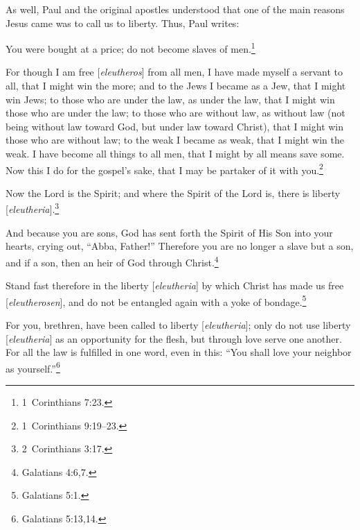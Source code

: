 \documentclass[letterpaper,12pt]{article}
\newenvironment{squote}
  {\small\quote}
  {\endquote\normalsize}
\begin{document}
As well, Paul and the original apostles understood that one of the main reasons Jesus came was to call us to liberty. Thus, Paul writes:

\begin{squote}
You were bought at a price; do not become slaves of men.\footnote{1~Corinthians 7:23.}
\end{squote}

\begin{squote}
For though I am free [\emph{eleutheros}] from all men, I have made myself a servant to all, that I might win the more; and to the Jews I became as a Jew, that I might win Jews; to those who are under the law, as under the law, that I might win those who are under the law; to those who are without law, as without law (not being without law toward God, but under law toward Christ), that I might win those who are without law; to the weak I became as weak, that I might win the weak. I have become all things to all men, that I might by all means save some. Now this I do for the gospel's sake, that I may be partaker of it with you.\footnote{1~Corinthians 9:19--23.}
\end{squote}

\begin{squote}
Now the Lord is the Spirit; and where the Spirit of the Lord is, there is liberty [\emph{eleutheria}].\footnote{2~Corinthians 3:17.}
\end{squote}

\begin{squote}
And because you are sons, God has sent forth the Spirit of His Son into your hearts, crying out, ``Abba, Father!'' Therefore you are no longer a slave but a son, and if a son, then an heir of God through Christ.\footnote{Galatians 4:6,7.}
\end{squote}

\begin{squote}
Stand fast therefore in the liberty [\emph{eleutheria}] by which Christ has made us free [\emph{eleutherosen}], and do not be entangled again with a yoke of bondage.\footnote{Galatians 5:1.}
\end{squote}

\begin{squote}
For you, brethren, have been called to liberty [\emph{eleutheria}]; only do not use liberty [\emph{eleutheria}] as an opportunity for the flesh, but through love serve one another. For all the law is fulfilled in one word, even in this: ``You shall love your neighbor as yourself.''\footnote{Galatians 5:13,14.}
\end{squote}
\end{document}

